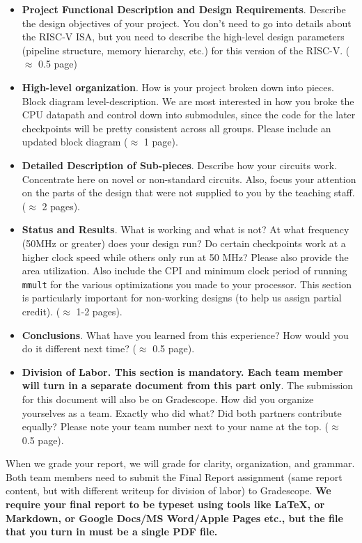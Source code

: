 \documentclass[11pt]{article}
\begin{document}
\begin{itemize}
  \item \textbf{Project Functional Description and Design Requirements}. Describe the design objectives of your project.  You don't need to go into details about the RISC-V ISA, but you need to describe the high-level design parameters (pipeline structure, memory hierarchy, etc.) for this version of the RISC-V. ($\approx$ 0.5 page)
  \item \textbf{High-level organization}. How is your project broken down into pieces. Block diagram level-description. We are most interested in how you broke the CPU datapath and control
  down into submodules, since the code for the later checkpoints will be pretty consistent across all groups. Please include an updated block diagram ($\approx$ 1 page).
  \item \textbf{Detailed Description of Sub-pieces}. Describe how your circuits work. Concentrate here on novel or non-standard circuits. Also, focus your attention on the parts of the design that were not supplied to you by the teaching staff. ($\approx$ 2 pages).
  \item \textbf{Status and Results}. What is working and what is not? At what frequency (50MHz or greater) does your design run? Do certain checkpoints work at a higher clock speed while others only run at 50 MHz? Please also provide the area utilization. Also include the CPI and minimum clock period of running \verb|mmult| for the various optimizations you made to your processor. This section is particularly important for non-working designs (to help us assign partial credit). ($\approx$ 1-2 pages).
  \item \textbf{Conclusions}. What have you learned from this experience? How would you do it different next time? ($\approx$ 0.5 page).
  \item \textbf{Division of Labor. This section is mandatory. Each team member will turn in a separate document from this part only}. The submission for this document will also be on Gradescope. How did you organize yourselves as a team. Exactly who did what? Did both partners contribute equally? Please note your team number next to your name at the top. ($\approx$ 0.5 page).
\end{itemize}

When we grade your report, we will grade for clarity, organization, and grammar.
Both team members need to submit the Final Report assignment (same report content, but with different writeup for division of labor) to Gradescope. \textbf{We require your final report to be typeset using tools like \LaTeX, or Markdown, or Google Docs/MS Word/Apple Pages etc., but the file that you turn in must be a single PDF file.}
\end{document}
